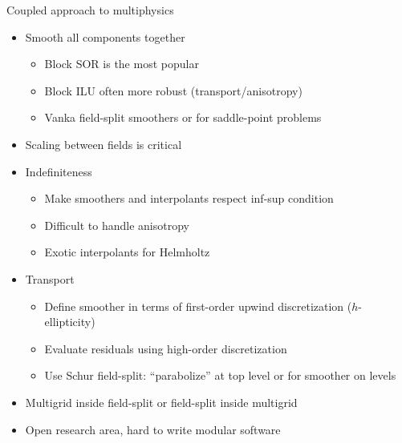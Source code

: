 \begin{frame}{Coupled approach to multiphysics}
  \begin{itemize}
  \item Smooth all components together
    \begin{itemize}
    \item Block SOR is the most popular
    \item Block ILU often more robust (\eg transport/anisotropy)
    \item Vanka field-split smoothers or for saddle-point problems
    \end{itemize}
  \item Scaling between fields is critical
  \item Indefiniteness
    \begin{itemize}
    \item Make smoothers and interpolants respect inf-sup condition
    \item Difficult to handle anisotropy
    \item Exotic interpolants for Helmholtz
    \end{itemize}
  \item Transport
    \begin{itemize}
    \item Define smoother in terms of first-order upwind discretization ($h$-ellipticity)
    \item Evaluate residuals using high-order discretization
    \item Use Schur field-split: ``parabolize'' at top level or for smoother on levels
    \end{itemize}
  \item Multigrid inside field-split or field-split inside multigrid
  \item Open research area, hard to write modular software
  \end{itemize}
\end{frame}
